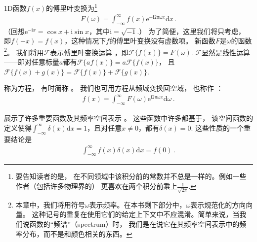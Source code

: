 1D函数$f(x)$的傅里叶变换为\footnote{要告知读者的是，
    在不同领域中该积分前的常数并不总是一样的。例如一些作者（包括许多物理界的）
    更喜欢在两个积分前乘上$\frac{1}{\sqrt{2\pi}}$.}
\begin{align}\label{eq:7.1}
    F(\omega)=\int_{-\infty}^{\infty}f(x)\mathrm{e}^{-\mathrm{i}2\pi\omega x}\mathrm{d}x\, .
\end{align}
（回想$\mathrm{e}^{-\mathrm{i}x}=\cos x+\mathrm{i}\sin x$，其中$\mathrm{i}=\sqrt{-1}$.）
为了简便，这里我们将只考虑，
即$f(-x)=f(x)$，这种情况下$f$的傅里叶变换没有虚数项。
新函数$F$是$\omega$的函数
\footnote{本章中，我们将用符号$\omega$表示频率。在本书剩下部分中，$\omega$表示规范化的方向向量。
    这种记号的重复在使用它们的给定上下文中不应混淆。简单来说，当我们说函数的“频谱”（spectrum）时，
    我们是在说它在其频率空间表示中的频率分布，而不是和颜色相关的东西。}。
我们将用$\mathcal{F}$表示傅里叶变换运算
，即$\mathcal{F}\{f(x)\}=F(\omega)$.
$\mathcal{F}$显然是线性运算——即对任意标量$a$都有$\mathcal{F}\{af(x)\}=a\mathcal{F}\{f(x)\}$，
且$\mathcal{F}\{f(x)+g(x)\}=\mathcal{F}\{f(x)\}+\mathcal{F}\{g(x)\}$.

称为方程，
有时简称
。
我们也可用方程从频域变换回空域，
也称作
：
\begin{align}\label{eq:7.2}
    f(x)=\int_{-\infty}^{\infty}F(\omega)\mathrm{e}^{\mathrm{i}2\pi\omega x}\mathrm{d}\omega\, .
\end{align}

展示了许多重要函数及其频率空间表示
。
这些函数中许多都基于，
该空间函数的定义使得$\displaystyle\int_{-\infty}^{\infty}\delta(x)\mathrm{d}x=1$，且对任意$x\neq0$，都有$\delta(x)=0$.
这些性质的一个重要结论是
\begin{align*}
    \int_{-\infty}^{\infty} f(x)\delta(x)\mathrm{d}x=f(0)\, .
\end{align*}


